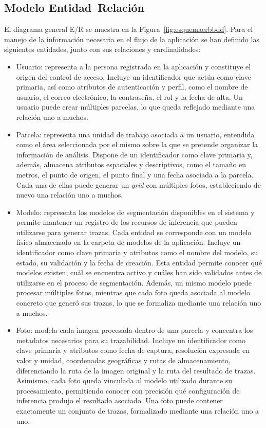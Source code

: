 \subsection{Modelo Entidad--Relación}

El diagrama general E/R se muestra en la Figura~\ref{fig:esquemaerbbdd}. Para el manejo de la información necesaria en el flujo de la aplicación se han definido las siguientes entidades, junto con sus relaciones y cardinalidades:

\begin{itemize}
	\item Usuario: representa a la persona registrada en la aplicación y constituye el origen del control de acceso. Incluye un identificador que actúa como clave primaria, así como atributos de autenticación y perfil, como el nombre de usuario, el correo electrónico, la contraseña, el rol y la fecha de alta. Un usuario puede crear múltiples parcelas, lo que queda reflejado mediante una relación uno a muchos.
	
	\item Parcela: representa una unidad de trabajo asociada a un usuario, entendida como el área seleccionada por el mismo sobre la que se pretende organizar la información de análisis. Dispone de un identificador como clave primaria y, además, almacena atributos espaciales y descriptivos, como el tamaño en metros, el punto de origen, el punto final y una fecha asociada a la parcela. Cada una de ellas puede generar un \textit{grid} con múltiples fotos, estableciendo de nuevo una relación uno a muchos.
	
	\item Modelo: representa los modelos de segmentación disponibles en el sistema y permite mantener un registro de los recursos de inferencia que pueden utilizarse para generar trazas. Cada entidad se corresponde con un modelo físico almacenado en la carpeta de modelos de la aplicación. Incluye un identificador como clave primaria y atributos como el nombre del modelo, su estado, su validación y la fecha de creación. Esta entidad permite conocer qué modelos existen, cuál se encuentra activo y cuáles han sido validados antes de utilizarse en el proceso de segmentación. Además, un mismo modelo puede procesar múltiples fotos, mientras que cada foto queda asociada al modelo concreto que generó sus trazas, lo que se formaliza mediante una relación uno a muchos.
	
	\item Foto: modela cada imagen procesada dentro de una parcela y concentra los metadatos necesarios para su trazabilidad. Incluye un identificador como clave primaria y atributos como fecha de captura, resolución expresada en valor y unidad, coordenadas geográficas y rutas de almacenamiento, diferenciando la ruta de la imagen original y la ruta del resultado de trazas. Asimismo, cada foto queda vinculada al modelo utilizado durante su procesamiento, permitiendo conocer con precisión qué configuración de inferencia produjo el resultado asociado. Una foto puede contener exactamente un conjunto de trazas, formalizado mediante una relación uno a uno.
	

\end{itemize}

